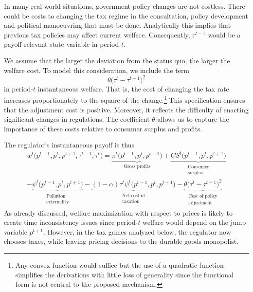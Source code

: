 In many real-world situations, government policy changes are not costless.
There could be costs to changing the tax regime in the consultation, policy
development and political manoeuvring that must be done. Analytically this
implies that previous tax policies may affect current welfare. Consequently, 
$\tau ^{t-1}$ would be a payoff-relevant state variable in period $t$. 

We assume that the larger the deviation from the status quo, the larger the
welfare cost. To model this consideration, we include the term 
\begin{equation}
\theta \big(\tau ^{t}-\tau ^{t-1}\big)^{2}  \label{eq:18}
\end{equation}%
in period-$t$ instantaneous welfare. That is, the cost of changing the tax
rate increases proportionately to the square of the change.\footnote{%
Any convex function would suffice but the use of a quadratic function
simplifies the derivations with little loss of generality since the
functional form is not central to the proposed mechanism.} This
specification ensures that the adjustment cost is positive. Moreover, it
reflects the difficulty of enacting significant changes in regulations. The
coefficient $\theta $ allows us to capture the importance of these costs
relative to consumer surplus and profits.

The regulator's instantaneous payoff is thus 
\begin{multline}
w^{t}\big(p^{t-1},p^{t},p^{t+1},\tau ^{t-1},\tau ^{t}\big)=\underbrace{\pi
^{t}\big(p^{t-1},p^{t},p^{t+1}\big)}_{\mbox{Gross
      profits}}+\underbrace{CS^{t}\big(p^{t-1},p^{t},p^{t+1}\big)}
_{\substack{ \mbox{Consumer} \\ \mbox{surplus}}}  \label{eq:19} \\
-\underbrace{\psi ^{t}\big(p^{t-1},p^{t},p^{t+1}\big)}_{\substack{ %
\mbox{Pollution} \\ \mbox{externality}}}-\underbrace{(1-\alpha )\tau
^{t}\psi ^{t}\big(p^{t-1},p^{t},p^{t+1}\big)}_{\substack{ \mbox{Net cost of}
\\ \mbox{taxation}}}-\underbrace{\theta \big(\tau ^{t}-\tau ^{t-1}\big)^{2}}
_{\substack{ \mbox{Cost of
        policy} \\ \mbox{adjustment}}}
\end{multline}%
As already discussed, welfare maximization with respect to prices is likely
to create time inconsistency issues since period-$t$ welfare would depend on
the jump variable $p^{t+1}$. However, in the tax games analyzed below, the
regulator now chooses taxes, while leaving pricing decisions to the durable
goods monopolist.

